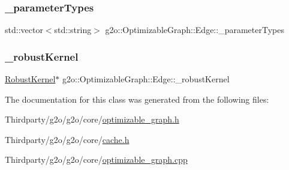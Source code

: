 \mbox{\label{classg2o_1_1_optimizable_graph_1_1_edge_a08666609850240956c64c95ae5ae0f2c}} 
\subsubsection{\texorpdfstring{\+\_\+parameter\+Types}{\_parameterTypes}}
{\footnotesize\ttfamily std\+::vector$<$std\+::string$>$ g2o\+::\+Optimizable\+Graph\+::\+Edge\+::\+\_\+parameter\+Types\hspace{0.3cm}{\ttfamily [protected]}}

\mbox{\label{classg2o_1_1_optimizable_graph_1_1_edge_a6b942321f9e4e82051d529efb255af35}} 
\subsubsection{\texorpdfstring{\+\_\+robust\+Kernel}{\_robustKernel}}
{\footnotesize\ttfamily \mbox{\hyperlink{classg2o_1_1_robust_kernel}{Robust\+Kernel}}$\ast$ g2o\+::\+Optimizable\+Graph\+::\+Edge\+::\+\_\+robust\+Kernel\hspace{0.3cm}{\ttfamily [protected]}}



The documentation for this class was generated from the following files\+:\begin{DoxyCompactItemize}
\item 
Thirdparty/g2o/g2o/core/\mbox{\hyperlink{optimizable__graph_8h}{optimizable\+\_\+graph.\+h}}\item 
Thirdparty/g2o/g2o/core/\mbox{\hyperlink{cache_8h}{cache.\+h}}\item 
Thirdparty/g2o/g2o/core/\mbox{\hyperlink{optimizable__graph_8cpp}{optimizable\+\_\+graph.\+cpp}}\end{DoxyCompactItemize}
